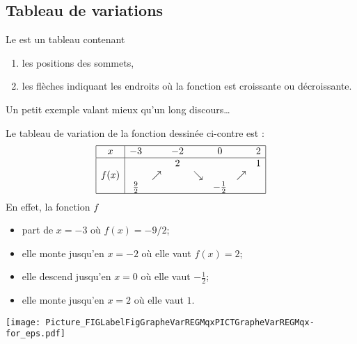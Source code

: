 \subsection{Tableau de variations}

Le  est un tableau contenant
\begin{enumerate}
    \item
        les positions des sommets,
    \item
        les flèches indiquant les endroits où la fonction est croissante ou décroissante.
\end{enumerate}
Un petit exemple valant mieux qu'un long discours\ldots

\begin{multicols}{2}

    Le tableau de variation de la fonction dessinée ci-contre est :
    \begin{equation}
    \begin{array}[h]{|c|ccccccc|}
        \hline
        x&-3&&-2&&0&&2\\
        \hline
        &&&2&&&&1\\
        f(x)&&\nearrow&&\searrow&&\nearrow&\\
        &\frac{ 9 }{2}&&&&-\frac{ 1 }{2}&&\\
        \hline
    \end{array}
    \end{equation}
    En effet, la fonction \( f\)
    \begin{itemize}
        \item 
            part de \( x=-3\) où \( f(x)=-9/2\);
        \item
            elle monte jusqu'en \( x=-2\) où elle vaut \( f(x)=2\);
        \item
            elle descend jusqu'en \( x=0\) où elle vaut \( -\frac{ 1 }{2}\);
        \item
            elle monte jusqu'en \( x=2\) où elle vaut \( 1\).
    \end{itemize}

\columnbreak


\texttt{[image: Picture\_FIGLabelFigGrapheVarREGMqxPICTGrapheVarREGMqx-for\_eps.pdf]}

\end{multicols}


%


